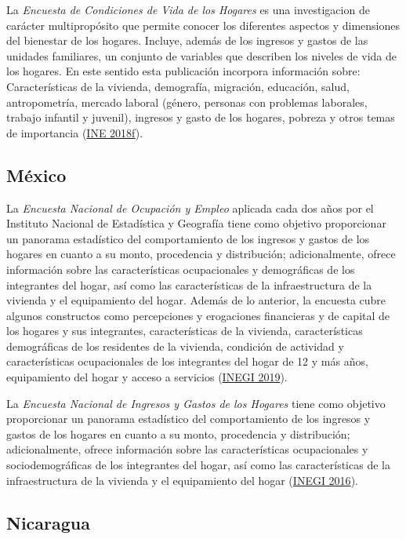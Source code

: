\documentclass[
  12pt,
  spanish,
]{book}
\begin{document}
La \emph{Encuesta de Condiciones de Vida de los Hogares} es una investigacion de carácter multipropósito que permite conocer los diferentes aspectos y dimensiones del bienestar de los hogares. Incluye, además de los ingresos y gastos de las unidades familiares, un conjunto de variables que describen los niveles de vida de los hogares. En este sentido esta publicación incorpora información sobre: Características de la vivienda, demografía, migración, educación, salud, antropometría, mercado laboral (género, personas con problemas laborales, trabajo infantil y juvenil), ingresos y gasto de los hogares, pobreza y otros temas de importancia (\protect\hyperlink{ref-INE2-HN}{INE 2018f}).

\hypertarget{muxe9xico}{%
\subsection*{México}\label{muxe9xico}}

La \emph{Encuesta Nacional de Ocupación y Empleo} aplicada cada dos años por el Instituto Nacional de Estadística y Geografía tiene como objetivo proporcionar un panorama estadístico del comportamiento de los ingresos y gastos de los hogares en cuanto a su monto, procedencia y distribución; adicionalmente, ofrece información sobre las características ocupacionales y demográficas de los integrantes del hogar, así como las características de la infraestructura de la vivienda y el equipamiento del hogar. Además de lo anterior, la encuesta cubre algunos constructos como percepciones y erogaciones financieras y de capital de los hogares y sus integrantes, características de la vivienda, características demográficas de los residentes de la vivienda, condición de actividad y características ocupacionales de los integrantes del hogar de 12 y más años, equipamiento del hogar y acceso a servicios (\protect\hyperlink{ref-INEGI-MX}{INEGI 2019}).

La \emph{Encuesta Nacional de Ingresos y Gastos de los Hogares} tiene como objetivo proporcionar un panorama estadístico del comportamiento de los ingresos y gastos de los hogares en cuanto a su monto, procedencia y distribución; adicionalmente, ofrece información sobre las características ocupacionales y sociodemográficas de los integrantes del hogar, así como las características de la infraestructura de la vivienda y el equipamiento del hogar (\protect\hyperlink{ref-INEGI2-MX}{INEGI 2016}).

\hypertarget{nicaragua}{%
\subsection*{Nicaragua}\label{nicaragua}}
\end{document}
